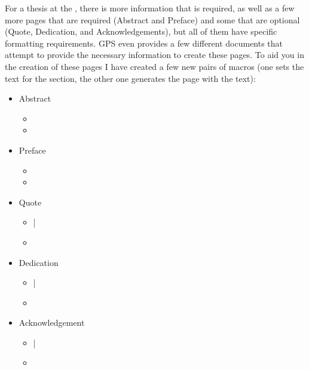 		For a thesis at the \UofA, there is more information that is required, as well as a few more pages that are required (Abstract and Preface) and some that are optional (Quote, Dedication, and Acknowledgements), but all of them have specific formatting requirements.
		GPS even provides a few different documents that attempt to provide the necessary information to create these pages\cite{FGPS2024}.
		To aid you in the creation of these pages I have created a few new pairs of macros (one sets the text for the section, the other one generates the page with the text):
		\begin{itemize}
			\item Abstract
				\begin{itemize}
					\item {}
					\item {}
				\end{itemize}
			\item Preface
				\begin{itemize}
					\item {}
					\item {}
				\end{itemize}
			\item Quote
				\begin{itemize}
					\item {}|
					\item {}
				\end{itemize}
			\item Dedication
				\begin{itemize}
					\item {}|
					\item {}
				\end{itemize}
			\item Acknowledgement
				\begin{itemize}
					\item {}|
					\item {}
				\end{itemize}
		\end{itemize}


